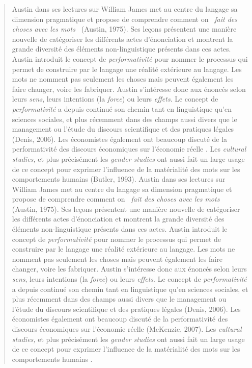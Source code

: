 \begin{quote}
Austin dans ses lectures sur William James met au centre du langage sa dimension pragmatique et propose de comprendre comment on \textit{{\guillemotleft}~fait des choses avec les mots~{\guillemotright}} (Austin, 1975). Ses le\c{c}ons pr\'esentent une mani\`ere nouvelle de cat\'egoriser les diff\'erents actes d{\textquoteright}\'enonciation et montrent la grande diversit\'e des \'el\'ements non-linguistique pr\'esents dans ces actes. Austin introduit le concept de \textit{performativit\'e }pour nommer le processus qui permet de construire par le langage une r\'ealit\'e ext\'erieure au langage. Les mots ne nomment pas seulement les choses mais peuvent \'egalement les faire changer, voire les fabriquer. Austin s{\textquoteright}int\'eresse donc aux \'enonc\'es selon leurs \textit{sens}, leurs intentions (la \textit{force}) ou leurs \textit{effets}. Le concept de \textit{performativit\'e }a depuis continu\'e son chemin tant en linguistique qu{\textquoteright}en sciences sociales, et plus r\'ecemment dans des champs aussi divers que le management ou l{\textquoteright}\'etude du discours scientifique et des pratiques l\'egales (Denis, 2006). Les \'economistes \'egalement ont beaucoup discut\'e de la performativit\'e des discours \'economiques sur l{\textquoteright}\'economie r\'eelle \cite{McKenzie2007}. Les \textit{cultural studies,} et plus pr\'ecis\'ement les \textit{gender studies }ont aussi fait un large usage de ce concept pour exprimer l{\textquoteright}influence de la mat\'erialit\'e des mots sur les comportements humains (Butler, 1993).  
Austin dans ses lectures sur William James met au centre du langage sa dimension pragmatique et propose de comprendre comment on \textit{{\guillemotleft}~fait des choses avec les mots~{\guillemotright}} (Austin, 1975). Ses le\c{c}ons pr\'esentent une mani\`ere nouvelle de cat\'egoriser les diff\'erents actes d{\textquoteright}\'enonciation et montrent la grande diversit\'e des \'el\'ements non-linguistique pr\'esents dans ces actes. Austin introduit le concept de \textit{performativit\'e }pour nommer le processus qui permet de construire par le langage une r\'ealit\'e ext\'erieure au langage. Les mots ne nomment pas seulement les choses mais peuvent \'egalement les faire changer, voire les fabriquer. Austin s{\textquoteright}int\'eresse donc aux \'enonc\'es selon leurs \textit{sens}, leurs intentions (la \textit{force}) ou leurs \textit{effets}. Le concept de \textit{performativit\'e }a depuis continu\'e son chemin tant en linguistique qu{\textquoteright}en sciences sociales, et plus r\'ecemment dans des champs aussi divers que le management ou l{\textquoteright}\'etude du discours scientifique et des pratiques l\'egales (Denis, 2006). Les \'economistes \'egalement ont beaucoup discut\'e de la performativit\'e des discours \'economiques sur l{\textquoteright}\'economie r\'eelle (McKenzie, 2007). Les \textit{cultural studies,} et plus pr\'ecis\'ement les \textit{gender studies }ont aussi fait un large usage de ce concept pour exprimer l{\textquoteright}influence de la mat\'erialit\'e des mots sur les comportements humains \cite{Butler1993}.  

\end{quote}
